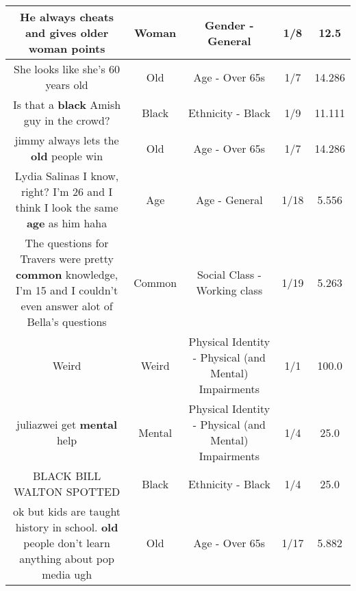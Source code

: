\documentclass[11pt]{article}
\newlength\mylength
\begin{document}
\begin{center}
\begin{longtable}{|C{.65\mylength}|C{.30\mylength}|C{.12\mylength}|C{.12\mylength}|C{.12\mylength}|}
  \small He always cheats and gives older \textbf{woman} points\normalsize   & Woman & Gender - General & 1/8 & 12.5 \\  \hline
  \small She looks like she's 60 years old\normalsize   & Old & Age - Over 65s & 1/7 & 14.286 \\  \hline
  \small Is that a \textbf{black} Amish guy in the crowd?\normalsize   & Black & Ethnicity - Black & 1/9 & 11.111 \\  \hline
  \small jimmy always lets the \textbf{old} people win\normalsize   & Old & Age - Over 65s & 1/7 & 14.286 \\  \hline
  \small Lydia Salinas I know, right? I'm 26 and I think I look the same \textbf{age} as him haha\normalsize   & Age & Age - General & 1/18 & 5.556 \\  \hline
  \small The questions for Travers were pretty \textbf{common} knowledge, I'm 15 and I couldn't even answer alot of Bella's questions\normalsize   & Common & Social Class - Working class & 1/19 & 5.263 \\  \hline
  \small Weird\normalsize   & Weird & Physical Identity - Physical (and Mental) Impairments & 1/1 & 100.0 \\  \hline
  \small juliazwei get \textbf{mental} help\normalsize   & Mental & Physical Identity - Physical (and Mental) Impairments & 1/4 & 25.0 \\  \hline
  \small BLACK BILL WALTON SPOTTED\normalsize   & Black & Ethnicity - Black & 1/4 & 25.0 \\  \hline
  \small ok but kids are taught history in school. \textbf{old} people don't learn anything about pop media  ugh\normalsize   & Old & Age - Over 65s & 1/17 & 5.882 \\  \hline

\end{longtable}
\end{center}
\end{document}
